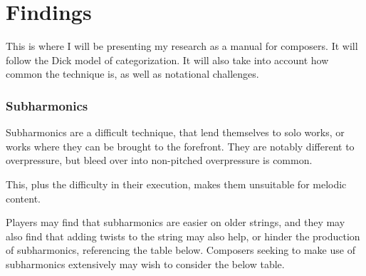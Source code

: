 
\chapter{Findings}
This is where I will be presenting my research as a manual for composers. 
It will follow the Dick model of categorization.\autocite{dickOtherFlute1989} 
It will also take into account how common the technique is, as well as notational challenges.

\subsection{Subharmonics}
Subharmonics are a difficult technique, that lend themselves to solo works, or works where they can be brought to the forefront.
They are notably different to overpressure, but bleed over into non-pitched overpressure is common.

This, plus the difficulty in their execution, makes them unsuitable for melodic content.

Players may find that subharmonics are easier on older strings, and they may also find that adding twists to the string may also help, or hinder the production of subharmonics, referencing the table below. Composers seeking to make use of subharmonics extensively may wish to consider the below table.

